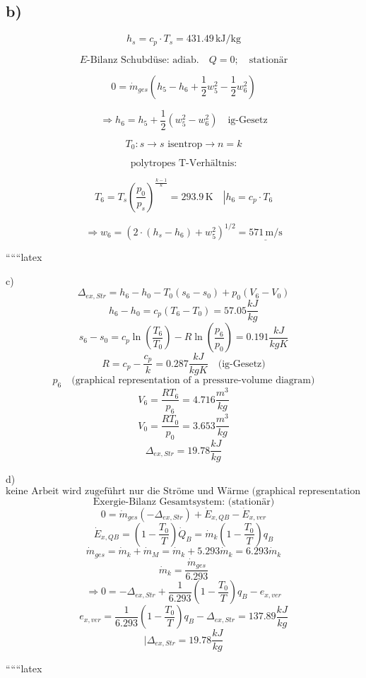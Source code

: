 \subsection*{b)}

\[
h_s = c_p \cdot T_s = 431.49 \, \text{kJ/kg}
\]

\[
E\text{-Bilanz Schubdüse: adiab.} \quad Q = 0; \quad \text{stationär}
\]

\[
0 = \dot{m}_{ges} \left( h_5 - h_6 + \frac{1}{2} w_5^2 - \frac{1}{2} w_6^2 \right)
\]

\[
\Rightarrow h_6 = h_5 + \frac{1}{2} (w_5^2 - w_6^2) \quad \text{ig-Gesetz}
\]

\[
T_0: s \rightarrow s \text{ isentrop} \rightarrow n = k
\]

\[
\text{polytropes T-Verhältnis:}
\]

\[
T_6 = T_s \left( \frac{p_0}{p_s} \right)^{\frac{k-1}{k}} = 293.9 \, \text{K} \quad \left| h_6 = c_p \cdot T_6 \right.
\]

\[
\Rightarrow w_6 = \left( 2 \cdot (h_s - h_6) + w_5^2 \right)^{1/2} = \underline{571 \, \text{m/s}}
\]


``````latex


c)
\[
\Delta_{ex,Str} = h_6 - h_0 - T_0 (s_6 - s_0) + p_0 (V_6 - V_0)
\]
\[
h_6 - h_0 = c_p (T_6 - T_0) = 57.05 \frac{kJ}{kg}
\]
\[
s_6 - s_0 = c_p \ln \left( \frac{T_6}{T_0} \right) - R \ln \left( \frac{p_6}{p_0} \right) = 0.191 \frac{kJ}{kgK}
\]
\[
R = c_p - \frac{c_p}{k} = 0.287 \frac{kJ}{kgK} \quad \text{(ig-Gesetz)}
\]
\[
p_6 \quad \text{(graphical representation of a pressure-volume diagram)}
\]
\[
V_6 = \frac{RT_6}{p_6} = 4.716 \frac{m^3}{kg}
\]
\[
V_0 = \frac{RT_0}{p_0} = 3.653 \frac{m^3}{kg}
\]
\[
\Delta_{ex,Str} = 19.78 \frac{kJ}{kg}
\]

d)
\[
\text{keine Arbeit wird zugeführt nur die Ströme und Wärme (graphical representation of a system with arrows indicating mass and energy flows)}
\]
\[
\text{Exergie-Bilanz Gesamtsystem: (stationär)}
\]
\[
0 = \dot{m}_{ges} (-\Delta_{ex,Str}) + \dot{E}_{x,QB} - \dot{E}_{x,ver}
\]
\[
\dot{E}_{x,QB} = \left( 1 - \frac{T_0}{T} \right) \dot{Q}_B = \dot{m}_k \left( 1 - \frac{T_0}{T} \right) q_B
\]
\[
\dot{m}_{ges} = \dot{m}_k + \dot{m}_M = \dot{m}_k + 5.293 \dot{m}_k = 6.293 \dot{m}_k
\]
\[
\dot{m}_k = \frac{\dot{m}_{ges}}{6.293}
\]
\[
\Rightarrow 0 = -\Delta_{ex,Str} + \frac{1}{6.293} \left( 1 - \frac{T_0}{T} \right) q_B - e_{x,ver}
\]
\[
e_{x,ver} = \frac{1}{6.293} \left( 1 - \frac{T_0}{T} \right) q_B - \Delta_{ex,Str} = 137.89 \frac{kJ}{kg}
\]
\[
| \Delta_{ex,Str} = 19.78 \frac{kJ}{kg}
\]

``````latex


